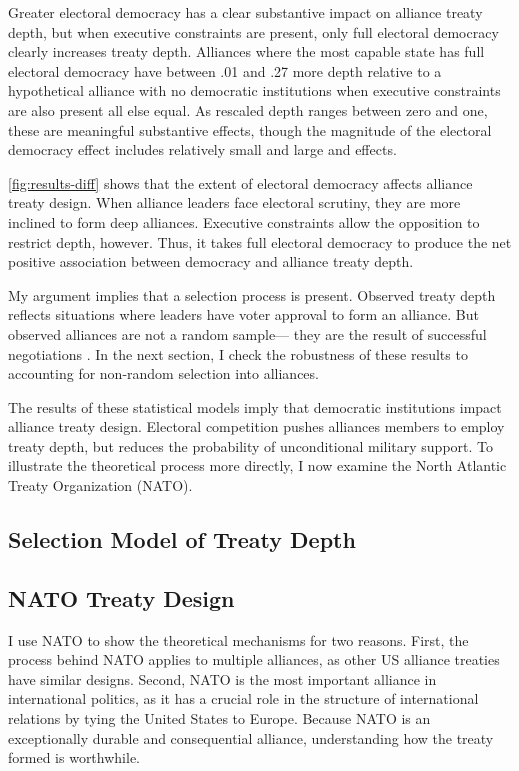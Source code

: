 \documentclass[12pt]{article}
\begin{document}
Greater electoral democracy has a clear substantive impact on alliance treaty depth, but when executive constraints are present, only full electoral democracy clearly increases treaty depth. 
Alliances where the most capable state has full electoral democracy have between .01 and .27 more depth relative to a hypothetical alliance with no democratic institutions when executive constraints are also present all else equal.
As rescaled depth ranges between zero and one, these are meaningful substantive effects, though the magnitude of the electoral democracy effect includes relatively small and large and effects. 


\autoref{fig:results-diff} shows that the extent of electoral democracy affects alliance treaty design.
When alliance leaders face electoral scrutiny, they are more inclined to form deep alliances. 
Executive constraints allow the opposition to restrict depth, however.
Thus, it takes full electoral democracy to produce the net positive association between democracy and alliance treaty depth. 


My argument implies that a selection process is present. 
Observed treaty depth reflects situations where leaders have voter approval to form an alliance.
But observed alliances are not a random sample--- they are the result of successful negotiations \citep{Poast2019a}. 
In the next section, I check the robustness of these results to accounting for non-random selection into alliances. 



The results of these statistical models imply that democratic institutions impact alliance treaty design. 
Electoral competition pushes alliances members to employ treaty depth, but reduces the probability of unconditional military support.  
To illustrate the theoretical process more directly, I now examine the North Atlantic Treaty Organization (NATO).


\subsection{Selection Model of Treaty Depth} 



\subsection{NATO Treaty Design}


I use NATO to show the theoretical mechanisms for two reasons. 
First, the process behind NATO applies to multiple alliances, as other US alliance treaties have similar designs. 
Second, NATO is the most important alliance in international politics, as it has a crucial role in the structure of international relations by tying the United States to Europe. 
Because NATO is an exceptionally durable and consequential alliance, understanding how the treaty formed is worthwhile. 
\end{document}
